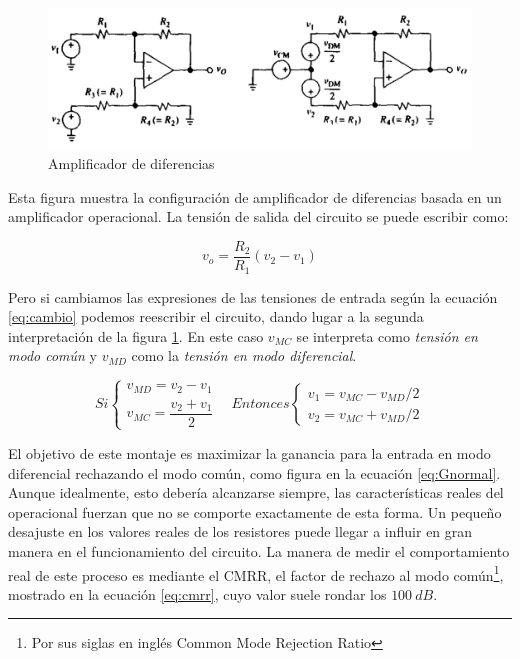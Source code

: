 \begin{figure}[!thb]
\begin{center}
\includegraphics[width=13cm]{img/adiferencias.png}
\caption{\label{fig:adif}Amplificador de diferencias}
\end{center}
\end{figure}

Esta figura muestra la configuración de amplificador de diferencias basada en un amplificador operacional. La tensión de salida del circuito se puede escribir como:

\begin{equation}
\label{eq:Gnormal}
v_{o} = \dfrac{R_{2}}{R_{1}}(v_{2}-v_{1})
\end{equation}

Pero si cambiamos las expresiones de las tensiones de entrada según la ecuación \ref{eq:cambio} podemos reescribir el circuito, dando lugar a la segunda interpretación de la figura \ref{fig:adif}. En este caso $v_{MC}$ se interpreta como \emph{tensión en modo común} y $v_{MD}$ como la \emph{tensión en modo diferencial}.

\begin{equation}
\label{eq:cambio}
Si \begin{cases} v_{MD}=v_{2}-v_{1} \\ v_{MC}=\dfrac{v_{2}+v_{1}}{2}  \end{cases}~~~~Entonces \begin{cases} v_{1}=v_{MC}-v_{MD}/2 \\ v_{2}=v_{MC}+v_{MD}/2  \end{cases}
\end{equation}

El objetivo de este montaje es maximizar la ganancia para la entrada en modo diferencial rechazando el modo común, como figura en la ecuación \ref{eq:Gnormal}. Aunque idealmente, esto debería alcanzarse siempre, las características reales del operacional fuerzan que no se comporte exactamente de esta forma. Un pequeño desajuste en los valores reales de los resistores puede llegar a influir en gran manera en el funcionamiento del circuito. La manera de medir el comportamiento real de este proceso es mediante el CMRR, el factor de rechazo al modo común\footnote{Por sus siglas en inglés Common Mode Rejection Ratio}, mostrado en la ecuación \ref{eq:cmrr}, cuyo valor suele rondar los $100~dB$.

